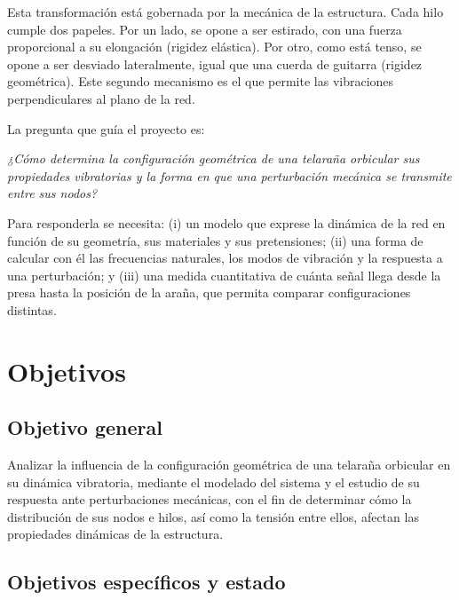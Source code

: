 \documentclass[11pt,letterpaper]{article}
\begin{document}
Esta transformación está gobernada por la mecánica de la estructura. Cada
hilo cumple dos papeles. Por un lado, se opone a ser estirado, con una fuerza
proporcional a su elongación (rigidez elástica). Por otro, como está tenso,
se opone a ser desviado lateralmente, igual que una cuerda de guitarra
(rigidez geométrica). Este segundo mecanismo es el que permite las
vibraciones perpendiculares al plano de la red.

La pregunta que guía el proyecto es:

\begin{center}
\textit{¿Cómo determina la configuración geométrica de una telaraña
orbicular sus propiedades vibratorias y la forma en que una perturbación
mecánica se transmite entre sus nodos?}
\end{center}

Para responderla se necesita: (i) un modelo que exprese la dinámica de la
red en función de su geometría, sus materiales y sus pretensiones; (ii) una
forma de calcular con él las frecuencias naturales, los modos de vibración y
la respuesta a una perturbación; y (iii) una medida cuantitativa de cuánta
señal llega desde la presa hasta la posición de la araña, que permita
comparar configuraciones distintas.

\section{Objetivos}\label{sec:objetivos}

\subsection*{Objetivo general}
Analizar la influencia de la configuración geométrica de una telaraña
orbicular en su dinámica vibratoria, mediante el modelado del sistema y el
estudio de su respuesta ante perturbaciones mecánicas, con el fin de
determinar cómo la distribución de sus nodos e hilos, así como la tensión
entre ellos, afectan las propiedades dinámicas de la estructura.

\subsection*{Objetivos específicos y estado}
\end{document}
